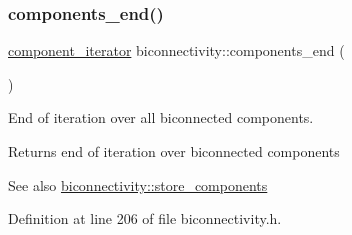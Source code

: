 \subsubsection{\texorpdfstring{components\+\_\+end()}{components\_end()}}
{\footnotesize\ttfamily \mbox{\hyperlink{classbiconnectivity_aef69aa0c23bfcd945e385350154b6483}{component\+\_\+iterator}} biconnectivity\+::components\+\_\+end (\begin{DoxyParamCaption}{ }\end{DoxyParamCaption})\hspace{0.3cm}{\ttfamily [inline]}}



End of iteration over all biconnected components. 

\begin{DoxyReturn}{Returns}
end of iteration over biconnected components 
\end{DoxyReturn}
\begin{DoxySeeAlso}{See also}
\mbox{\hyperlink{classbiconnectivity_a1234e7a70f50fd60c855529fe6fa4acb}{biconnectivity\+::store\+\_\+components}} 
\end{DoxySeeAlso}


Definition at line 206 of file biconnectivity.\+h.


